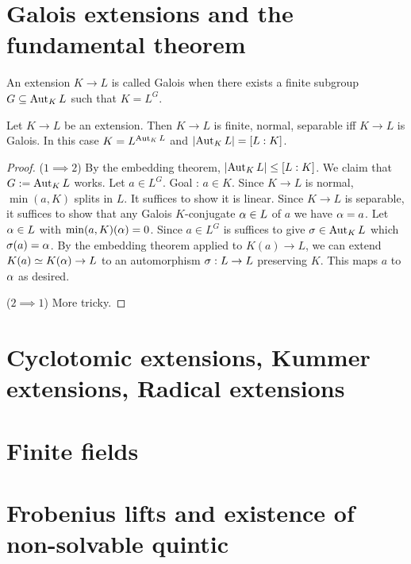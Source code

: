 \documentclass{article}
\begin{document}


\section{Galois extensions and the fundamental theorem}

\begin{dfn}
  An extension $K \to L$ is called Galois
  when there exists a finite subgroup $G \subseteq \operatorname{Aut}_K L$
  such that $K = L^G$.
\end{dfn}

\begin{prop}
  Let $K \to L$ be an extension.
  Then $K \to L$ is finite, normal, separable
  iff $K \to L$ is Galois.
  In this case $K = L^{\operatorname{Aut}_K L}$ and $\left\vert \operatorname{Aut}_K L \right\vert = [L : K]$.
\end{prop}
\begin{proof}
  ($1 \implies 2$)
  By the embedding theorem, $\left\vert \operatorname{Aut}_K L \right\vert \leq [L : K]$.
  We claim that $G := \operatorname{Aut}_K L$ works.
  Let $a \in L^G$. Goal : $a \in K$.
  Since $K \to L$ is normal, $\min(a, K)$ splits in $L$.
  It suffices to show it is linear.
  Since $K \to L$ is separable, it suffices to show
  that any Galois $K$-conjugate $\alpha \in L$ of $a$
  we have $\alpha = a$.
  Let $\alpha \in L$ with $\min(a , K)(\alpha) = 0$.
  Since $a \in L^G$ is suffices to give $\sigma \in \operatorname{Aut}_K L$
  which $\sigma(a) = \alpha$.
  By the embedding theorem applied to $K(a) \to L$,
  we can extend $K(a) \simeq K(\alpha) \to L$ to an automorphism
  $\sigma : L \to L$ preserving $K$.
  This maps $a$ to $\alpha$ as desired.

  ($2 \implies 1$) More tricky.

\end{proof}

\section{Cyclotomic extensions, Kummer extensions, Radical extensions}

\section{Finite fields}

\section{Frobenius lifts and existence of non-solvable quintic}

\printbibliography
\end{document}
